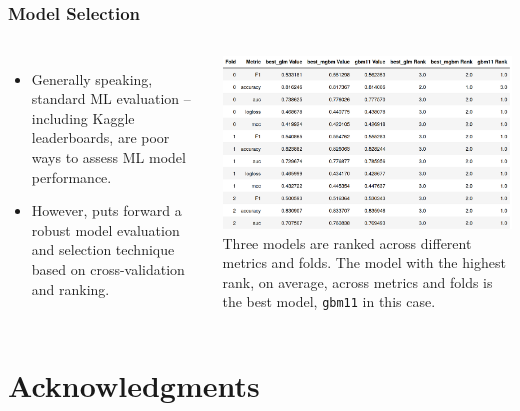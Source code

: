 \documentclass[11pt,aspectratio=169,hyperref={colorlinks}]{beamer}
\begin{document}
	\subsection*{}
	
	\begin{frame}
	
		\frametitle{Model Selection}		
	
	\begin{columns}
		
		\begin{itemize}
			\item Generally speaking, standard ML evaluation -- including Kaggle leaderboards, are poor ways to assess ML model performance.
			\item However, \cite{caruana2004kdd} puts forward a robust model evaluation and selection technique based on cross-validation and ranking. 
		\end{itemize}
	
		\centering
		\includegraphics[height=130pt]{../img/cv_ranking.png}\vspace{5pt}
		\scriptsize{Three models are ranked across different metrics and folds. The model with the highest rank, on average, across metrics and folds is the best model, \texttt{gbm11} in this case.}
		
	\end{columns}
	
\end{frame}	

\section{Acknowledgments}

\subsection*{}
\end{document}
